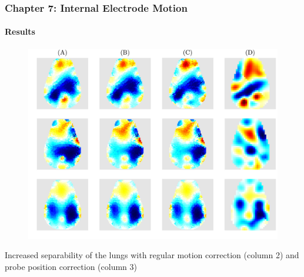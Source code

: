 \documentclass[10pt,    %
    english,            %
    xcolor=table,       %
    envcountsect,        %
    aspectratio=1610
]{beamer}
\begin{document}
\begin{frame}
	\frametitle{Chapter 7: Internal Electrode Motion}
	\framesubtitle{Results}
			\begin{figure}[H]
				\centering
				\includegraphics[width=\textwidth,trim={0cm 0cm 10cm 20cm},clip]{lamb_reconstruction_all.pdf}
			\end{figure}
			Increased separability of the lungs with regular motion correction (column 2) and 
			probe position correction (column 3)
\end{frame}
\end{document}
